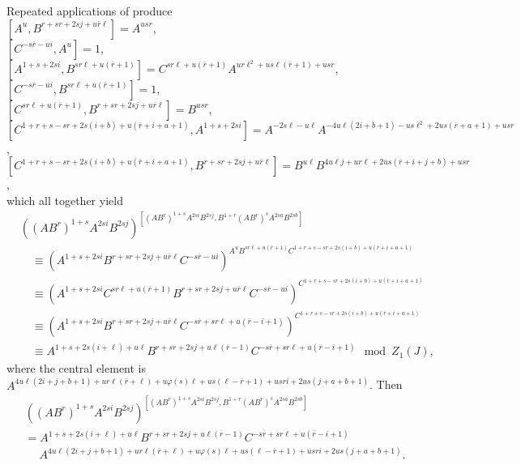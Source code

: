 \documentclass{amsart}
\theoremstyle{definition}
\theoremstyle{remark}
\begin{document}
Repeated applications of \cite[Theorem 3.1]{MS3} produce\\
$[A^u,B^{r + sr + 2sj + u\overline{r}\ell}] = A^{usr}$,\\
$[C^{-s\overline{r} - ui},A^u] = 1$,\\
$[A^{1 + s + 2si},B^{sr\ell + u(\overline{r} + 1)}] = C^{sr\ell + u(\overline{r} + 1)} A^{ur\ell^2 + us\ell(\overline{r} + 1) + usr}$,\\
$[C^{-s\overline{r} - ui},B^{sr\ell + u(\overline{r} + 1)}] = 1$,\\
$[C^{sr\ell + u(\overline{r} + 1)},B^{r + sr + 2sj + u\overline{r}\ell}] = B^{usr}$,\\
$[C^{1 + r + s - sr + 2s(i + b) + u(\overline{r} + i+ a + 1)},A^{1 + s + 2si}] = A^{-2s\ell - u\ell} A^{-4u\ell(2i + b + 1) - us\ell^2 + 2us(\overline{r} + a + 1) + usr}$,\\
$[C^{1 + r + s - sr + 2s(i + b) + u(\overline{r} + i+ a + 1)},B^{r + sr + 2sj + u\overline{r}\ell}] = B^{u\ell} B^{4u\ell j + ur\ell + 2us(\overline{r} + i + j + b) + usr}$,\\
which all together yield
\begin{align*}
    &((AB^r)^{1+s} A^{2si} B^{2sj})^{[(AB^r)^{1+s} A^{2si} B^{2sj},B^{1+r} (AB^r)^s A^{2sa} B^{2sb}]}\\
    &\quad\equiv (A^{1 + s + 2si} B^{r + sr + 2sj + u\overline{r}\ell} C^{-s\overline{r} - ui})^{A^u B^{sr\ell + u(\overline{r} + 1)} C^{1 + r + s - sr + 2s(i + b) + u(\overline{r} + i+ a + 1)}}\\
    &\quad\equiv (A^{1 + s + 2si} C^{sr\ell + u(\overline{r} + 1)} B^{r + sr + 2sj + u\overline{r}\ell} C^{-s\overline{r} - ui})^{C^{1 + r + s - sr + 2s(i + b) + u(\overline{r} + i+ a + 1)}}\\
    &\quad\equiv (A^{1 + s + 2si} B^{r + sr + 2sj + u\overline{r}\ell} C^{-s\overline{r} + sr\ell + u(\overline{r} - i + 1)})^{C^{1 + r + s - sr + 2s(i + b) + u(\overline{r} + i+ a + 1)}}\\
    &\quad\equiv A^{1 + s + 2s(i + \ell) + u\ell} B^{r + sr + 2sj + u\ell(\overline{r} - 1)} C^{-s\overline{r} + sr\ell + u(\overline{r} - i + 1)}\mod Z_1(J),
\end{align*}
where the central element is $A^{4u\ell(2i + j + b + 1) + ur\ell(\overline{r} + \ell) + u\varphi(s)\ell + us(\ell - \overline{r} + 1) + usri + 2us(j + a + b + 1)}$. Then
\begin{equation}\label{eq.L.1}
    \begin{split}
        &((AB^r)^{1+s} A^{2si} B^{2sj})^{[(AB^r)^{1+s} A^{2si} B^{2sj},B^{1+r} (AB^r)^s A^{2sa} B^{2sb}]}\\
        &= A^{1 + s + 2s(i + \ell) + u\ell} B^{r + sr + 2sj + u\ell(\overline{r} - 1)} C^{-s\overline{r} + sr\ell + u(\overline{r} - i + 1)}\\
        &\quad\; A^{4u\ell(2i + j + b + 1) + ur\ell(\overline{r} + \ell) + u\varphi(s)\ell + us(\ell - \overline{r} + 1) + usri + 2us(j + a + b + 1)}.
    \end{split}
\end{equation}
\end{document}

